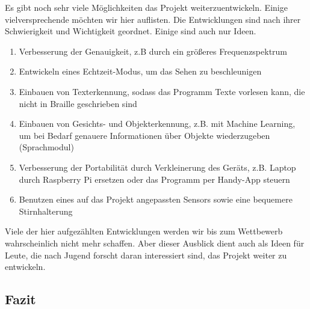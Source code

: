 \documentclass[a4paper,12pt,ngerman]{scrartcl}
\begin{document}
Es gibt noch sehr viele Möglichkeiten das Projekt weiterzuentwickeln. Einige vielversprechende
möchten wir hier auflisten. Die Entwicklungen sind nach ihrer Schwierigkeit und Wichtigkeit geordnet. Einige sind auch nur Ideen.
\begin{enumerate}
	\item Verbesserung der Genauigkeit, z.B durch ein größeres Frequenzspektrum
	\item Entwickeln eines Echtzeit-Modus, um das Sehen zu beschleunigen
	\item Einbauen von Texterkennung, sodass das Programm Texte vorlesen kann, die nicht in Braille geschrieben sind
	\item Einbauen von Gesichts- und Objekterkennung, z.B. mit Machine Learning, um bei Bedarf genauere 
	Informationen über Objekte wiederzugeben (Sprachmodul)
	\item Verbesserung der Portabilität durch Verkleinerung des Geräts, z.B. Laptop durch Raspberry Pi ersetzen oder das Programm per
	Handy-App steuern
	\item Benutzen eines auf das Projekt angepassten Sensors sowie eine bequemere Stirnhalterung
\end{enumerate}
Viele der hier aufgezählten Entwicklungen werden wir bis zum Wettbewerb wahrscheinlich nicht 
mehr schaffen. Aber dieser Ausblick dient auch als Ideen für Leute, die nach Jugend forscht 
daran interessiert sind, das Projekt weiter zu entwickeln. 

\subsection{Fazit}
\end{document}
